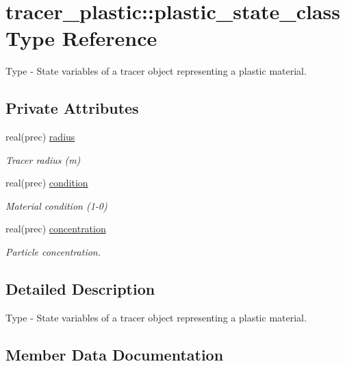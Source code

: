 \hypertarget{structtracer__plastic_1_1plastic__state__class}{}\section{tracer\+\_\+plastic\+:\+:plastic\+\_\+state\+\_\+class Type Reference}
\label{structtracer__plastic_1_1plastic__state__class}


Type -\/ State variables of a tracer object representing a plastic material.  


\subsection*{Private Attributes}
\begin{DoxyCompactItemize}
\item 
real(prec) \mbox{\hyperlink{structtracer__plastic_1_1plastic__state__class_a88e8fcff3faa943e9134fd3b43264d38}{radius}}
\begin{DoxyCompactList}\small\item\em Tracer radius (m) \end{DoxyCompactList}\item 
real(prec) \mbox{\hyperlink{structtracer__plastic_1_1plastic__state__class_a6420065359daf0885201b79212f13b5f}{condition}}
\begin{DoxyCompactList}\small\item\em Material condition (1-\/0) \end{DoxyCompactList}\item 
real(prec) \mbox{\hyperlink{structtracer__plastic_1_1plastic__state__class_a132bc977b49dc7bd320ca843bca6eab1}{concentration}}
\begin{DoxyCompactList}\small\item\em Particle concentration. \end{DoxyCompactList}\end{DoxyCompactItemize}


\subsection{Detailed Description}
Type -\/ State variables of a tracer object representing a plastic material. 

\subsection{Member Data Documentation}
\mbox{\label{structtracer__plastic_1_1plastic__state__class_a132bc977b49dc7bd320ca843bca6eab1}} 
